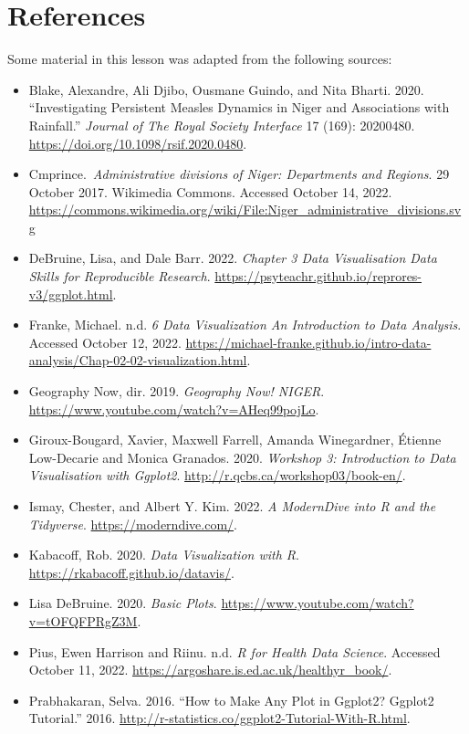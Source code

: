 \documentclass[
  letterpaper,
  DIV=11,
  numbers=noendperiod]{scrreprt}
\begin{document}
\hypertarget{references-13}{%
\section*{References}\label{references-13}}


Some material in this lesson was adapted from the following sources:

\begin{itemize}
\item
  Blake, Alexandre, Ali Djibo, Ousmane Guindo, and Nita Bharti. 2020.
  ``Investigating Persistent Measles Dynamics in Niger and Associations
  with Rainfall.'' \emph{Journal of The Royal Society Interface} 17
  (169): 20200480. \url{https://doi.org/10.1098/rsif.2020.0480}.
\item
  Cmprince.~\emph{Administrative divisions of Niger: Departments and
  Regions}. 29 October 2017. Wikimedia Commons. Accessed October 14,
  2022.
  \url{https://commons.wikimedia.org/wiki/File:Niger_administrative_divisions.svg}
\item
  DeBruine, Lisa, and Dale Barr. 2022. \emph{Chapter 3 Data
  Visualisation \textbar{} Data Skills for Reproducible Research}.
  \url{https://psyteachr.github.io/reprores-v3/ggplot.html}.
\item
  Franke, Michael. n.d. \emph{6 Data Visualization \textbar{} An
  Introduction to Data Analysis}. Accessed October 12, 2022.
  \url{https://michael-franke.github.io/intro-data-analysis/Chap-02-02-visualization.html}.
\item
  Geography Now, dir. 2019. \emph{Geography Now! NIGER}.
  \url{https://www.youtube.com/watch?v=AHeq99pojLo}.
\item
  Giroux-Bougard, Xavier, Maxwell Farrell, Amanda Winegardner, Étienne
  Low-Decarie and Monica Granados. 2020. \emph{Workshop 3: Introduction
  to Data Visualisation with Ggplot2}.
  \url{http://r.qcbs.ca/workshop03/book-en/}.
\item
  Ismay, Chester, and Albert Y. Kim. 2022. \emph{A ModernDive into R and
  the Tidyverse}. \url{https://moderndive.com/}.
\item
  Kabacoff, Rob. 2020. \emph{Data Visualization with R}.
  \url{https://rkabacoff.github.io/datavis/}.
\item
  Lisa DeBruine. 2020. \emph{Basic Plots}.
  \url{https://www.youtube.com/watch?v=tOFQFPRgZ3M}.
\item
  Pius, Ewen Harrison and Riinu. n.d. \emph{R for Health Data Science}.
  Accessed October 11, 2022.
  \url{https://argoshare.is.ed.ac.uk/healthyr_book/}.
\item
  Prabhakaran, Selva. 2016. ``How to Make Any Plot in Ggplot2?
  \textbar{} Ggplot2 Tutorial.'' 2016.
  \url{http://r-statistics.co/ggplot2-Tutorial-With-R.html}.
\end{itemize}
\end{document}
